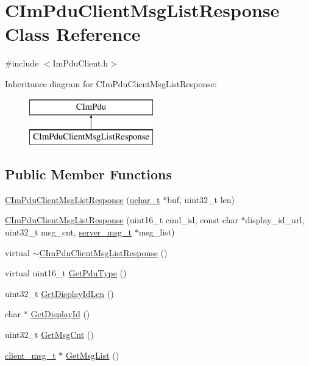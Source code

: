 \hypertarget{class_c_im_pdu_client_msg_list_response}{}\section{C\+Im\+Pdu\+Client\+Msg\+List\+Response Class Reference}
\label{class_c_im_pdu_client_msg_list_response}


{\ttfamily \#include $<$Im\+Pdu\+Client.\+h$>$}

Inheritance diagram for C\+Im\+Pdu\+Client\+Msg\+List\+Response\+:\begin{figure}[H]
\begin{center}
\leavevmode
\includegraphics[height=2.000000cm]{class_c_im_pdu_client_msg_list_response}
\end{center}
\end{figure}
\subsection*{Public Member Functions}
\begin{DoxyCompactItemize}
\item 
\hyperlink{class_c_im_pdu_client_msg_list_response_a2c2f85d043f2438e29a4a4d853101d74}{C\+Im\+Pdu\+Client\+Msg\+List\+Response} (\hyperlink{base_2ostype_8h_a124ea0f8f4a23a0a286b5582137f0b8d}{uchar\+\_\+t} $\ast$buf, uint32\+\_\+t len)
\item 
\hyperlink{class_c_im_pdu_client_msg_list_response_aecfb86824a0b9349292399a0bfa75a36}{C\+Im\+Pdu\+Client\+Msg\+List\+Response} (uint16\+\_\+t cmd\+\_\+id, const char $\ast$display\+\_\+id\+\_\+url, uint32\+\_\+t msg\+\_\+cnt, \hyperlink{structserver__msg__t}{server\+\_\+msg\+\_\+t} $\ast$msg\+\_\+list)
\item 
virtual \hyperlink{class_c_im_pdu_client_msg_list_response_a364df45c5318a88dcdbe7d00ed48a677}{$\sim$\+C\+Im\+Pdu\+Client\+Msg\+List\+Response} ()
\item 
virtual uint16\+\_\+t \hyperlink{class_c_im_pdu_client_msg_list_response_a9cf59dcc9e910a60e87706c0017d9fa9}{Get\+Pdu\+Type} ()
\item 
uint32\+\_\+t \hyperlink{class_c_im_pdu_client_msg_list_response_adc098a8860c13a0cf35109863acf84a9}{Get\+Display\+Id\+Len} ()
\item 
char $\ast$ \hyperlink{class_c_im_pdu_client_msg_list_response_ab2d878bdfa283c6b48c1279e2182980b}{Get\+Display\+Id} ()
\item 
uint32\+\_\+t \hyperlink{class_c_im_pdu_client_msg_list_response_a0b6d4ebd504f480ae6b788a8678a62ec}{Get\+Msg\+Cnt} ()
\item 
\hyperlink{structclient__msg__t}{client\+\_\+msg\+\_\+t} $\ast$ \hyperlink{class_c_im_pdu_client_msg_list_response_a01db4ce9b937dbcc01f60c39afc23cac}{Get\+Msg\+List} ()
\end{DoxyCompactItemize}
